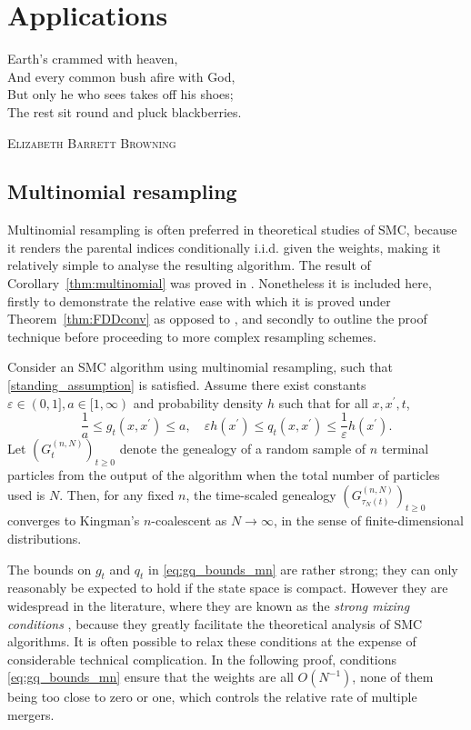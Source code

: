 \chapter{Applications}\label{ch:appl}

\epigraph{
Earth's crammed with heaven, \\
And every common bush afire with God, \\
But only he who sees takes off his shoes; \\
The rest sit round and pluck blackberries.
}
{\textsc{Elizabeth Barrett Browning}}


\section{Multinomial resampling \seb{$\checkmark$} }
Multinomial resampling is often preferred in theoretical studies of SMC, because it renders the parental indices conditionally i.i.d. given the weights, making it relatively simple to analyse the resulting algorithm.
The result of Corollary~\ref{thm:multinomial} was proved in \textcite[Corollary 1]{koskela2018}. Nonetheless it is included here, firstly to demonstrate the relative ease with which it is proved under Theorem~\ref{thm:FDDconv} as opposed to \textcite[Theorem 1]{koskela2018}, and secondly to outline the proof technique before proceeding to more complex resampling schemes.

\begin{corollary}\label{thm:multinomial}
Consider an SMC algorithm using multinomial resampling, such that \ref{standing_assumption} is satisfied. Assume there exist constants $\varepsilon\in (0,1], a\in [1,\infty)$ and probability density $h$ such that for all $x, x^\prime, t$,
\begin{equation}\label{eq:gq_bounds_mn}
\frac{1}{a} \leq g_t(x, x^\prime) \leq a , \quad
\varepsilon h(x^\prime) \leq q_t(x, x^\prime) \leq \frac{1}{\varepsilon} h(x^\prime) .
\end{equation}
Let $(G_t^{(n,N)})_{t\geq0}$ denote the genealogy of a random sample of $n$ terminal particles from the output of the algorithm when the total number of particles used is $N$. Then, for any fixed $n$, the time-scaled genealogy $(G_{\tau_N(t)}^{(n,N)})_{t\geq0}$ converges to Kingman's $n$-coalescent as $N\to \infty$, in the sense of finite-dimensional distributions.
\end{corollary}
The bounds on $g_t$ and $q_t$ in \eqref{eq:gq_bounds_mn} are rather strong; they can only reasonably be expected to hold if the state space is compact. However they are widespread in the literature, where they are known as the \emph{strong mixing conditions} \parencite[Section 3.5.2]{delmoral2004}, because they greatly facilitate the theoretical analysis of SMC algorithms. It is often possible to relax these conditions at the expense of considerable technical complication.
In the following proof, conditions \eqref{eq:gq_bounds_mn} ensure that the weights are all $O(N^{-1})$, none of them being too close to zero or one, which controls the relative rate of multiple mergers.

